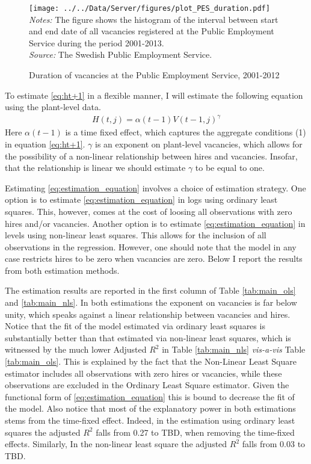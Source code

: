 \begin{figure}[t]
\centering
\caption{Duration of vacancies at the Public Employment Service, 2001-2012}
\texttt{[image: ../../Data/Server/figures/plot\_PES\_duration.pdf]}
\flushleft
\footnotesize{\emph{Notes:} The figure shows the histogram of the interval between start and end date of all vacancies registered at the Public Employment Service during the period 2001-2013.} \\
\footnotesize{\emph{Source:} The Swedish Public Employment Service.}
\label{fig:PES_duration}
\end{figure}

To estimate \eqref{eq:ht+1} in a flexible manner, I will estimate the following equation using the plant-level data.
\begin{align}
H(t,j)=\alpha(t-1) V(t-1,j)^{\gamma}
\label{eq:estimation_equation}
\end{align}
Here $\alpha(t-1)$ is a time fixed effect, which captures the aggregate conditions (1) in equation \eqref{eq:ht+1}. $\gamma$ is an exponent on plant-level vacancies, which allows for the possibility of a non-linear relationship between hires and vacancies. Insofar, that the relationship is linear we should estimate  $\gamma$ to be equal to one.

Estimating \eqref{eq:estimation_equation} involves a choice of estimation strategy. One option is to estimate \eqref{eq:estimation_equation} in logs using ordinary least squares. This, however, comes at the cost of loosing all observations with zero hires and/or vacancies. Another option is to estimate \eqref{eq:estimation_equation} in levels using non-linear least squares. This allows for the inclusion of all observations in the regression. However, one should note that the model in any case restricts hires to be zero when vacancies are zero. Below I report the results from both estimation methods. %

The estimation results are reported in the first column of Table \ref{tab:main_ols} and \ref{tab:main_nls}. In both estimations the exponent on vacancies is far below unity, which speaks against a linear relationship between vacancies and hires. Notice that the fit of the model estimated via ordinary least squares is substantially better than that estimated via non-linear least squares, which is witnessed by the much lower Adjusted $R^2$ in Table \ref{tab:main_nls} \emph{vis-a-vis} Table \ref{tab:main_ols}. This is explained by the fact that the Non-Linear Least Square estimator includes all observations with zero hires or vacancies, while these observations are excluded in the Ordinary Least Square estimator. Given the functional form of \ref{eq:estimation_equation} this is bound to decrease the fit of the model. Also notice that most of the explanatory power in both estimations stems from the time-fixed effect. Indeed, in the estimation using ordinary least squares the adjusted $R^2$ falls from 0.27 to TBD, when removing the time-fixed effects. Similarly, In the non-linear least square the adjusted  $R^2$ falls from 0.03 to TBD.

